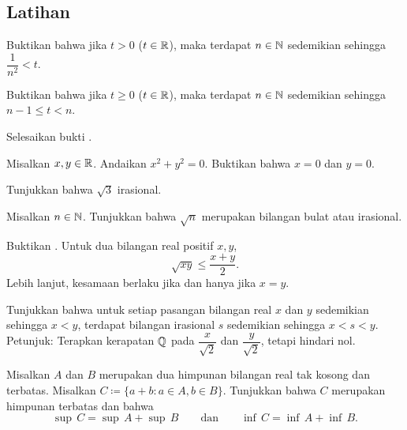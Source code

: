 \subsection{Latihan}

\begin{exercise}
Buktikan bahwa
jika $t > 0$ ($t \in {\mathbb{R}}$), maka terdapat $n \in {\mathbb{N}}$ sedemikian sehingga
$\dfrac{1}{n^2} < t$.
\end{exercise}

\begin{exercise}
Buktikan bahwa
jika $t \geq 0$ ($t \in {\mathbb{R}}$), maka terdapat $n \in {\mathbb{N}}$ sedemikian sehingga $n-1 \leq t < n$.
\end{exercise}

\begin{exercise}
Selesaikan bukti .
\end{exercise}

\begin{exercise}
Misalkan $x, y \in {\mathbb{R}}$.  Andaikan $x^2 + y^2 = 0$.  Buktikan bahwa $x = 0$ dan $y = 0$.
\end{exercise}

\begin{exercise}
Tunjukkan bahwa $\sqrt{3}$ irasional.
\end{exercise}

\begin{exercise}
Misalkan $n \in {\mathbb{N}}$.
Tunjukkan bahwa $\sqrt{n}$ merupakan bilangan bulat atau
irasional.
\end{exercise}

\begin{exercise}
Buktikan \emph{}.
Untuk dua bilangan real positif $x,y$,
\begin{equation*}
\sqrt{xy} \leq \frac{x+y}{2} .
\end{equation*}
Lebih lanjut, kesamaan berlaku jika dan hanya jika $x=y$.
\end{exercise}

\begin{exercise}
Tunjukkan bahwa untuk setiap pasangan bilangan real $x$ dan $y$ sedemikian sehingga $x < y$,
terdapat bilangan irasional $s$ sedemikian sehingga $x < s < y$.  Petunjuk:
Terapkan kerapatan ${\mathbb{Q}}$ pada $\dfrac{x}{\sqrt{2}}$ dan
$\dfrac{y}{\sqrt{2}}$, tetapi hindari nol.
\end{exercise}

\begin{exercise} \label{exercise:supofsum}
Misalkan $A$ dan $B$ merupakan dua himpunan bilangan real tak kosong dan terbatas.  Misalkan
$C \coloneqq \{ a+b : a \in A, b \in B \}$.
Tunjukkan bahwa $C$ merupakan himpunan terbatas dan bahwa
\begin{equation*}
\sup\,C = \sup\,A + \sup\,B
\qquad \text{dan} \qquad
\inf\,C = \inf\,A + \inf\,B .
\end{equation*}
\end{exercise}

